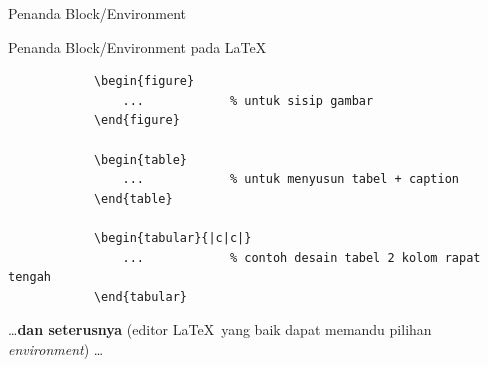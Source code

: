 \documentclass[11pt,            %
               aspectratio=169, %
               xcolor=svgnames,
               t                %
               ]{beamer}
\begin{document}
\begin{frame}[containsverbatim]{Penanda Block/Environment}

    \begin{block}{Penanda Block/Environment pada \LaTeX}
        \begin{verbatim}
            \begin{figure}
                ...            % untuk sisip gambar
            \end{figure}

            \begin{table}
                ...            % untuk menyusun tabel + caption
            \end{table}

            \begin{tabular}{|c|c|}
                ...            % contoh desain tabel 2 kolom rapat tengah
            \end{tabular}
        \end{verbatim}
    \end{block}
\ldots\textbf{dan seterusnya} (editor \LaTeX\ yang baik dapat memandu pilihan \textit{environment}) \ldots
\end{frame}

\end{document}
